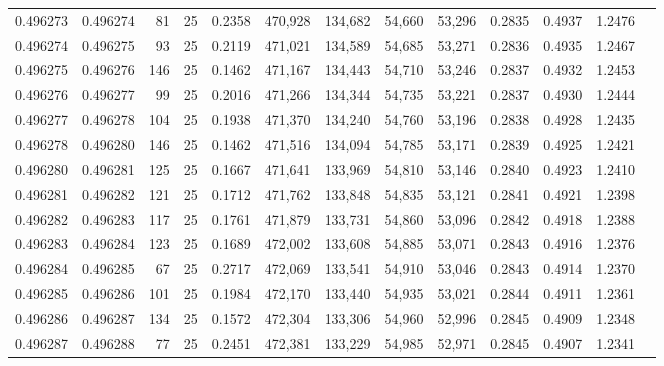 \begin{tabular}{rrrrrrrrrrrrr}
0.496273 & 0.496274 &    81 &  25 &                                     0.2358 & 470,928 & 134,682 &  54,660 &  53,296 & 0.2835 & 0.4937 & 1.2476 \\
0.496274 & 0.496275 &    93 &  25 &                                     0.2119 & 471,021 & 134,589 &  54,685 &  53,271 & 0.2836 & 0.4935 & 1.2467 \\
0.496275 & 0.496276 &   146 &  25 &                                     0.1462 & 471,167 & 134,443 &  54,710 &  53,246 & 0.2837 & 0.4932 & 1.2453 \\
0.496276 & 0.496277 &    99 &  25 &                                     0.2016 & 471,266 & 134,344 &  54,735 &  53,221 & 0.2837 & 0.4930 & 1.2444 \\
0.496277 & 0.496278 &   104 &  25 &                                     0.1938 & 471,370 & 134,240 &  54,760 &  53,196 & 0.2838 & 0.4928 & 1.2435 \\
0.496278 & 0.496280 &   146 &  25 &                                     0.1462 & 471,516 & 134,094 &  54,785 &  53,171 & 0.2839 & 0.4925 & 1.2421 \\
0.496280 & 0.496281 &   125 &  25 &                                     0.1667 & 471,641 & 133,969 &  54,810 &  53,146 & 0.2840 & 0.4923 & 1.2410 \\
0.496281 & 0.496282 &   121 &  25 &                                     0.1712 & 471,762 & 133,848 &  54,835 &  53,121 & 0.2841 & 0.4921 & 1.2398 \\
0.496282 & 0.496283 &   117 &  25 &                                     0.1761 & 471,879 & 133,731 &  54,860 &  53,096 & 0.2842 & 0.4918 & 1.2388 \\
0.496283 & 0.496284 &   123 &  25 &                                     0.1689 & 472,002 & 133,608 &  54,885 &  53,071 & 0.2843 & 0.4916 & 1.2376 \\
0.496284 & 0.496285 &    67 &  25 &                                     0.2717 & 472,069 & 133,541 &  54,910 &  53,046 & 0.2843 & 0.4914 & 1.2370 \\
0.496285 & 0.496286 &   101 &  25 &                                     0.1984 & 472,170 & 133,440 &  54,935 &  53,021 & 0.2844 & 0.4911 & 1.2361 \\
0.496286 & 0.496287 &   134 &  25 &                                     0.1572 & 472,304 & 133,306 &  54,960 &  52,996 & 0.2845 & 0.4909 & 1.2348 \\
0.496287 & 0.496288 &    77 &  25 &                                     0.2451 & 472,381 & 133,229 &  54,985 &  52,971 & 0.2845 & 0.4907 & 1.2341 \\

\end{tabular}
